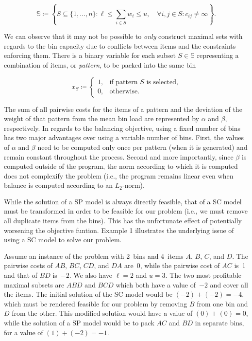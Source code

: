 \documentclass{llncs}
\begin{document}
\[
\mathbb{S} \coloneqq \left\{ S \subseteq \{1, \dots, n\} : \ell \leq \sum_{i \in S} w_{i} \leq u, \quad \forall i, j \in S:c_{ij} \neq \infty\right\}.
\]

We can observe that it may not be possible to \emph{only} construct maximal sets with regards to the bin capacity due to conflicts between items and the constraints enforcing them. There is a binary variable for each subset $S \in \mathbb{S}$ representing a combination of items, or \emph{pattern}, to be packed into the same bin

\begin{equation}
  x_{S}\coloneqq
  \begin{cases}
    1, & \mbox{if pattern $S$ is selected,} \\
    0, & \mbox{otherwise.}
  \end{cases}
\end{equation}

The sum of all pairwise costs for the items of a pattern and the deviation of the weight of that pattern from the mean bin load are represented by $\alpha$ and $\beta$, respectively. In regards to the balancing objective, using a fixed number of bins has two major advantages over using a variable number of bins. First, the values of $\alpha$ and $\beta$ need to be computed only once per pattern (when it is generated) and remain constant throughout the process. Second and more importantly, since $\beta$ is computed outside of the program, the norm according to which it is computed does not complexify the problem (i.e., the program remains linear even when balance is computed according to an $L_{2}$-norm).

While the solution of a SP model is always directly feasible, that of a SC model must be transformed in order to be feasible for our problem (i.e., we must remove all duplicate items from the bins). This has the unfortunate effect of potentially worsening the objective funtion. Example 1 illustrates the underlying issue of using a SC model to solve our problem.

\begin{example}
  Assume an instance of the problem with 2~bins and 4~items $A$, $B$, $C$, and $D$. The pairwise costs of $AB$, $BC$, $CD$, and $DA$ are~0, while the pairwise cost of $AC$ is~1 and that of $BD$ is~$-2$. We also have $\ell=2$ and $u=3$. The two most profitable maximal subsets are $ABD$ and $BCD$ which both have a value of~$-2$ and cover all the items. The initial solution of the SC model would be $(-2)+(-2)=-4$, which must be rendered feasible for our problem by removing $B$ from one bin and $D$ from the other. This modified solution would have a value of $(0)+(0)=0$, while the solution of a SP model would be to pack $AC$ and $BD$ in separate bins, for a value of $(1)+(-2)=-1$.
\end{example}
\end{document}
